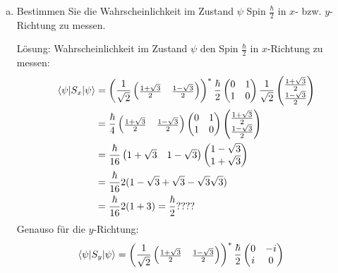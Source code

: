 \documentclass{scrartcl}
\begin{document}
\begin{enumerate}[a)]
\item Bestimmen Sie die Wahrscheinlichkeit im Zustand $\psi$ Spin $\frac{\hbar}{2}$ in $x$- bzw. $y$-Richtung zu messen.
\item[Lösung:]
Wahrscheinlichkeit im Zustand $\psi$ den Spin $\frac\hbar 2$ in $x$-Richtung zu messen:
\begin{align*}
\braket{\psi|S_x|\psi}	
	&= 
	\left(\frac 1{\sqrt 2} \begin{pmatrix}\frac{1+\sqrt 3}{2} & \frac{1-\sqrt 3}{2}\end{pmatrix}\right)^\ast
	\frac \hbar 2 \begin{pmatrix} 0&1\\1&0 \end{pmatrix}
	\frac 1{\sqrt 2}\begin{pmatrix}\frac{1+\sqrt 3}{2}\\\frac{1-\sqrt 3}{2}\end{pmatrix}\\
	&= 	
	\frac \hbar 4 \begin{pmatrix}\frac{1+\sqrt 3}{2} & \frac{1-\sqrt 3}{2}\end{pmatrix}
	\begin{pmatrix} 0&1\\1&0 \end{pmatrix}
	\begin{pmatrix}\frac{1+\sqrt 3}{2}\\\frac{1-\sqrt 3}{2}\end{pmatrix}\\
	&=
	\frac \hbar {16} \begin{pmatrix}1+\sqrt 3 & 1-\sqrt 3\end{pmatrix}
	\begin{pmatrix}1-\sqrt 3\\1+\sqrt 3\end{pmatrix}\\
	&=
	\frac \hbar {16} 2 (1 -\sqrt 3 +\sqrt 3 -\sqrt 3 \sqrt 3)\\ 
	&=
	\frac \hbar {16} 2 (1 + 3) = \frac \hbar 2 ????
\end{align*}
Genauso für die $y$-Richtung:
\begin{align*}
\braket{\psi|S_y|\psi}	
	&= 
	\left(\frac 1{\sqrt 2} \begin{pmatrix}\frac{1+\sqrt 3}{2} & \frac{1-\sqrt 3}{2}\end{pmatrix}\right)^\ast
	\frac \hbar 2 \begin{pmatrix} 0&-i\\i&0 \end{pmatrix}

\end{align*}
\end{enumerate}
\end{document}
